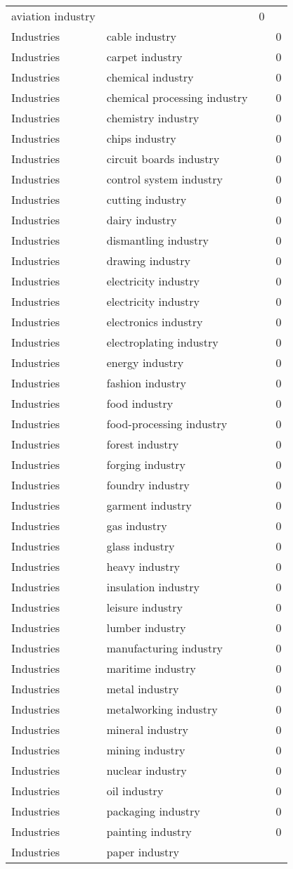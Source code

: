 {\begin{longtable}{lp{10cm}rr}
aviation industry &  & 0\\Industries & cable industry &  & 0\\Industries & carpet industry &  & 0\\Industries & chemical industry &  & 0\\Industries & chemical processing industry &  & 0\\Industries & chemistry industry &  & 0\\Industries & chips industry &  & 0\\Industries & circuit boards industry &  & 0\\Industries & control system industry &  & 0\\Industries & cutting industry &  & 0\\Industries & dairy industry &  & 0\\Industries & dismantling industry &  & 0\\Industries & drawing industry &  & 0\\Industries & electricity industry &  & 0\\Industries & electricity industry &  & 0\\Industries & electronics industry &  & 0\\Industries & electroplating industry &  & 0\\Industries & energy industry &  & 0\\Industries & fashion industry &  & 0\\Industries & food industry &  & 0\\Industries & food-processing industry &  & 0\\Industries & forest industry &  & 0\\Industries & forging industry &  & 0\\Industries & foundry industry &  & 0\\Industries & garment industry &  & 0\\Industries & gas industry &  & 0\\Industries & glass industry &  & 0\\Industries & heavy industry &  & 0\\Industries & insulation industry &  & 0\\Industries & leisure industry &  & 0\\Industries & lumber industry &  & 0\\Industries & manufacturing industry &  & 0\\Industries & maritime industry &  & 0\\Industries & metal industry &  & 0\\Industries & metalworking industry &  & 0\\Industries & mineral industry &  & 0\\Industries & mining industry &  & 0\\Industries & nuclear industry &  & 0\\Industries & oil industry &  & 0\\Industries & packaging industry &  & 0\\Industries & painting industry &  & 0\\Industries & paper industry 
\end{longtable}}
